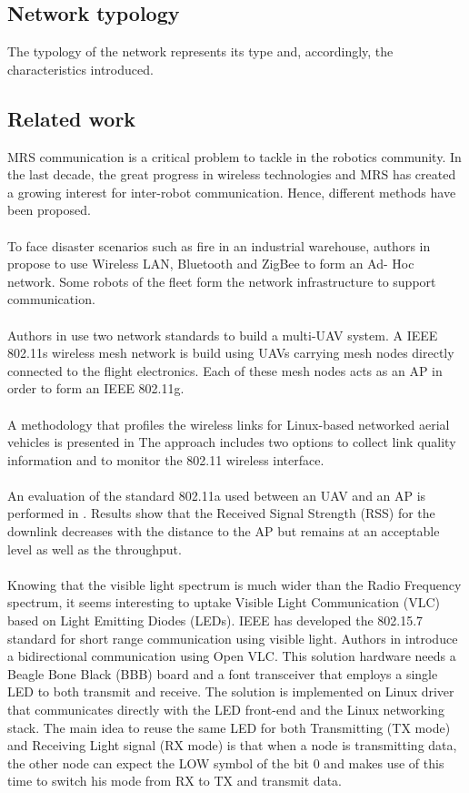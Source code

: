 \documentclass[11pt,openany]{book}
\begin{document}
\begin{algorimth}[H]
\section{Network typology}
The typology of the network represents its type and, accordingly, the characteristics introduced.
\subsection{Related work}
MRS communication is a critical problem to tackle in the robotics community. In the last decade, the great progress in wireless technologies and MRS has created a growing interest for inter-robot communication. Hence, diﬀerent methods have been proposed.\\\\
To face disaster scenarios such as ﬁre in an industrial warehouse, authors in \cite{witkowski2008ad} propose to use Wireless LAN, Bluetooth and ZigBee to form an Ad- Hoc network. Some robots of the ﬂeet form the network infrastructure to support communication.\\\\
Authors in \cite{morgenthaler2012uavnet} use two network standards to build a multi-UAV system. A IEEE 802.11s wireless mesh network is build using UAVs carrying mesh nodes directly connected to the ﬂight electronics. Each of these mesh nodes acts as an AP in order to form an IEEE 802.11g.\\\\
A methodology that proﬁles the wireless links for Linux-based networked aerial vehicles is presented in \cite{kuschnig2012profiling.} The approach includes two options to collect link quality information and to monitor the 802.11 wireless interface.\\\\
An evaluation of the standard 802.11a used between an UAV and an AP is performed in \cite{kuschnig2012profiling}. Results show that the Received Signal Strength (RSS) for the downlink decreases with the distance to the AP but remains at an acceptable level as well as the throughput.\\\\
Knowing that the visible light spectrum is much wider than the Radio Frequency spectrum, it seems interesting to uptake Visible Light Communication (VLC) based on Light Emitting Diodes (LEDs). IEEE has developed the 802.15.7 standard for short range communication using visible light. Authors in \cite{wang2014openvlc} introduce a bidirectional communication using Open VLC. This solution hardware needs a Beagle Bone Black (BBB) board and a font transceiver that employs a single LED to both transmit and receive. The solution is implemented on Linux driver that communicates directly with the LED front-end and the Linux networking stack. The main idea to reuse the same LED for both Transmitting (TX mode) and Receiving Light signal (RX mode) is that when a node is transmitting data, the other node can expect the LOW symbol of the bit 0 and makes use of this time to switch his mode from RX to TX and transmit data.\\\\

\end{algorimth}
\end{document}
